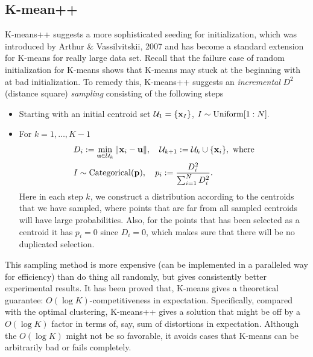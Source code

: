 \documentclass[../main.tex]{subfiles}
\begin{document}
\subsection{K-mean++}
K-means++ suggests a more sophisticated seeding for initialization, which was introduced by Arthur \& Vassilvitskii, 2007 and has become a standard extension for K-means for really large data set. Recall that the failure case of random initialization for K-means shows that K-means may stuck at the beginning with at bad initialization. To remedy this, K-means++ suggests an \emph{incremental} $D^2$ (distance square) \emph{sampling} consisting of the following steps
\begin{itemize}
	\item Starting with an initial centroid set $\mathcal{U}_1=\{{\bf x}_I\}$, $I\sim {\rm Uniform}[1:N].$
	\item For $k=1,\dots,K-1$
	\begin{align*}
	&D_i:=\min_{{\bf u}\in \mathcal{U}_k}\|{\bf x}_i-{\bf u}\|,\quad \mathcal{U}_{k+1}:=\mathcal{U}_{k}\cup \{{\bf x}_i\},\ \text{where}\\
	&I\sim {\rm Categorical}({\bf p}),\quad p_i:=\frac{D_i^2}{\sum_{i=1}^{N}D_i^2}.
	\end{align*}
	Here in each step $k$, we construct a distribution according to the centroids that we have sampled, where points that are far from all sampled centroids will have large probabilities. Also, for the points that has been selected as a centroid it has $p_i=0$ since $D_i=0$, which makes sure that there will be no duplicated selection.
\end{itemize}
This sampling method is more expensive (can be implemented in a paralleled way for efficiency) than do thing all randomly, but gives consistently better experimental results. It has been proved that, K-means gives a theoretical guarantee: $O(\log K)$-competitiveness in expectation. Specifically, compared with the optimal clustering, K-means++ gives a solution that might be off by a $O(\log K)$ factor in terms of, say, sum of distortions in expectation. Although the $O(\log K)$ might not be so favorable, it avoids cases that K-means can be arbitrarily bad or fails completely.
\end{document}
